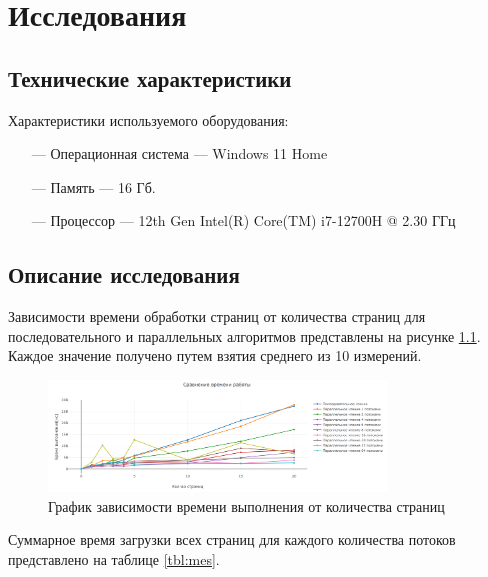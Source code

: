 \chapter{Исследования}

\section{Технические характеристики}
Характеристики используемого оборудования:
\begin{itemize}
    \item[---] Операционная система --- Windows 11 Home \cite{windows}
    \item[---] Память --- 16 Гб.
    \item[---] Процессор --- 12th Gen Intel(R) Core(TM) i7-12700H @  2.30 ГГц \cite{intel}
\end{itemize}

\section{Описание исследования}

Зависимости времени обработки страниц от количества страниц для последовательного и параллельных алгоритмов представлены на рисунке \ref{fig:plot}. Каждое значение получено путем взятия среднего из 10 измерений.

\begin{figure}[h]
	\centering
	\includegraphics[width=0.8\textwidth]{images/plot.png}
	\caption{График зависимости времени выполнения от количества страниц}
	\label{fig:plot}
\end{figure}

\clearpage

Суммарное время загрузки всех страниц для каждого количества потоков представлено на таблице \ref{tbl:mes}.

